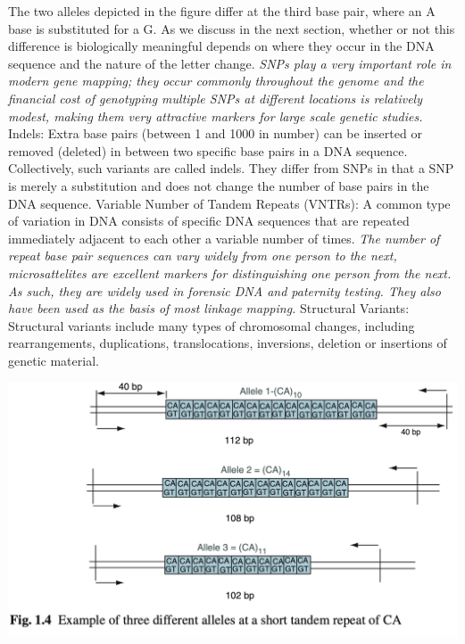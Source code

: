 \documentclass[a4paper,twoside,11pt]{article}
\begin{document}
The two alleles depicted in the figure differ at the third base pair, where an A base is substituted for a G. As we discuss in the next section, whether or not this difference is biologically meaningful depends on where they occur in the DNA sequence and the nature of the letter change.
\newline
\textcolor{NavyBlue}{\textit{SNPs play a very important role in modern gene mapping; they occur commonly throughout the genome and the financial cost of genotyping multiple SNPs at different locations is relatively modest, making them very attractive markers for large scale genetic studies.}}
\newline
\newline
\textcolor{NavyBlue}{Indels: }Extra base pairs (between 1 and 1000 in number) can be inserted or removed (deleted) in between two specific base pairs in a DNA sequence. Collectively, such variants are called indels. They differ from SNPs in that a SNP is merely a substitution and does not change the number of base pairs in the DNA sequence.
\newline
\newline
\textcolor{NavyBlue}{Variable Number of Tandem Repeats (VNTRs): }A common type of variation in DNA consists of specific DNA sequences that are repeated immediately adjacent to each other a variable number of times.
\newline
\newline
\textcolor{NavyBlue}{\textit{The number of repeat base pair sequences can vary widely from one person to the next, microsattelites are excellent markers for distinguishing one person from the next. As such, they are widely used in forensic DNA and paternity testing. They also have been used as the basis of most linkage mapping.}}
\newline
\newline
\textcolor{NavyBlue}{Structural Variants: }Structural variants include many types of chromosomal changes, including rearrangements, duplications, translocations, inversions, deletion or insertions of genetic material.
\begin{center}
\includegraphics[scale=0.5]{figure3.png}
\end{center}
\end{document}
